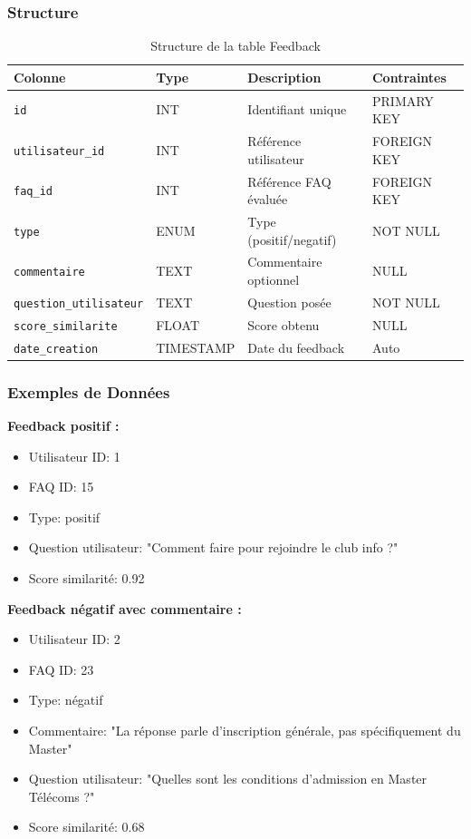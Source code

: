 \documentclass[11pt,a4paper]{article}
\begin{document}
\subsubsection{Structure}

\begin{table}[H]
\centering
\small
\begin{tabular}{|l|l|l|l|}
\hline
\textbf{Colonne} & \textbf{Type} & \textbf{Description} & \textbf{Contraintes} \\
\hline
\texttt{id} & INT & Identifiant unique & PRIMARY KEY \\
\hline
\texttt{utilisateur\_id} & INT & Référence utilisateur & FOREIGN KEY \\
\hline
\texttt{faq\_id} & INT & Référence FAQ évaluée & FOREIGN KEY \\
\hline
\texttt{type} & ENUM & Type (positif/negatif) & NOT NULL \\
\hline
\texttt{commentaire} & TEXT & Commentaire optionnel & NULL \\
\hline
\texttt{question\_utilisateur} & TEXT & Question posée & NOT NULL \\
\hline
\texttt{score\_similarite} & FLOAT & Score obtenu & NULL \\
\hline
\texttt{date\_creation} & TIMESTAMP & Date du feedback & Auto \\
\hline
\end{tabular}
\caption{Structure de la table Feedback}
\end{table}

\subsubsection{Exemples de Données}

\begin{exemple}
\textbf{Feedback positif :}
\begin{itemize}
    \item Utilisateur ID: 1
    \item FAQ ID: 15
    \item Type: positif
    \item Question utilisateur: "Comment faire pour rejoindre le club info ?"
    \item Score similarité: 0.92
\end{itemize}

\vspace{0.3cm}
\textbf{Feedback négatif avec commentaire :}
\begin{itemize}
    \item Utilisateur ID: 2
    \item FAQ ID: 23
    \item Type: négatif
    \item Commentaire: "La réponse parle d'inscription générale, pas spécifiquement du Master"
    \item Question utilisateur: "Quelles sont les conditions d'admission en Master Télécoms ?"
    \item Score similarité: 0.68
\end{itemize}
\end{exemple}
\end{document}
